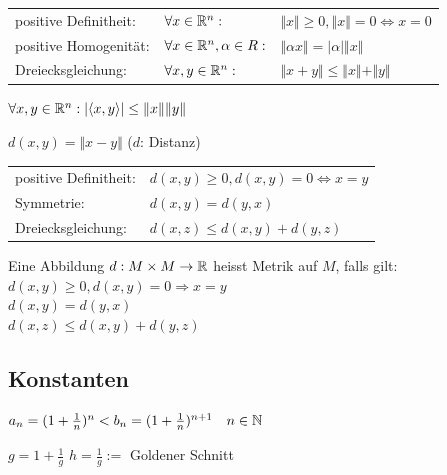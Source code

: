 \documentclass[a4paper]{article}
\begin{document}
\begin{appendix}
			\begin{feig}
				\begin{tabular}{l l l}
					positive Definitheit: & $\forall x \in \mathbb{R}^n:$ & $\Vert x \Vert \geq 0, \Vert x \Vert = 0 \Leftrightarrow x=
					0$\\
					positive Homogenität: & $\forall x \in \mathbb{R}^n, \alpha \in
					R:$ & $\Vert \alpha x \Vert = \vert\alpha\vert\Vert x
					\Vert$\\
					Dreiecksgleichung: & $\forall x,y \in \mathbb{R}^n:$ & $\Vert x+y\Vert \leq \Vert x\Vert+\Vert y\Vert$
				\end{tabular}
			\end{feig}
		
			\begin{fmerke}
				$\forall x,y \in \mathbb{R}^n: \vert \langle x,y\rangle \vert \leq \Vert x\Vert\Vert y\Vert$
			\end{fmerke}
		
			\begin{fregeln} $d(x,y) = \Vert x-y\Vert$
			($d$: Distanz)\\
				\begin{tabular}{l l}
					positive Definitheit: & $d(x,y) \geq 0, d(x,y)=0 \Leftrightarrow
					x=y$\\
					Symmetrie: & $d(x,y)=d(y,x)$\\
					Dreiecksgleichung: & $d(x,z) \leq d(x,y) + d(y,z)$
				\end{tabular}
			\end{fregeln}
				
			\begin{fmerke}[Metrik]
				Eine Abbildung $d: M \times M \rightarrow \mathbb{R}$ heisst Metrik
				auf $M$, falls gilt:\\
				$d(x,y) \geq 0, d(x,y) = 0 \Rightarrow x=y$\\
				$d(x,y) = d(y,x)$\\
				$d(x,z) \leq d(x,y)+d(y,z)$
			\end{fmerke}
			
		\subsection{Konstanten}			
			\begin{fmerke}
				$a_n = (1 + \frac{1}{n})^n < b_n= (1 + \frac{1}{n})^{n+1} \quad n\in \mathbb{N}$
			\end{fmerke}
		
			\begin{fmerke}
				$g = 1 + \frac{1}{g}$ \quad $h = \frac{1}{g}:=$ Goldener
				Schnitt
			\end{fmerke}
	\end{appendix}
	
\end{document}
